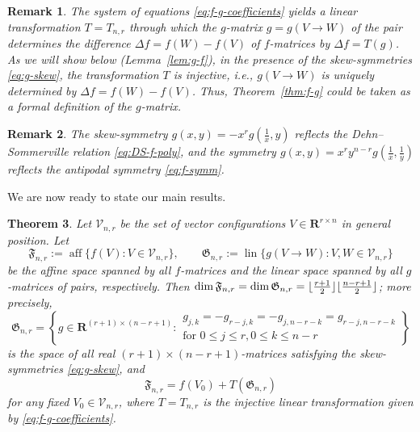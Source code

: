 \documentclass[11pt]{article}
\newtheorem{theorem}{Theorem}
\newtheorem{remark}[theorem]{Remark}
\DeclareMathOperator{\aff}{aff}
\DeclareMathOperator{\lin}{lin}
\newcommand{\fspace}{\mathfrak{F}}
\newcommand{\gspace}{\mathfrak{G}}
\renewcommand{\leq}{\leqslant}
\newcommand{\R}{\mathbf{R}}
\DeclarePairedDelimiter\floor{\lfloor}{\rfloor}
\begin{document}
\begin{remark} 
\label{rem:g-f+DS-g}
The system of equations \eqref{eq:f-g-coefficients} yields a linear transformation $T=T_{n,r}$ through which 
the $g$-matrix $g=g(V\to W)$ of the pair determines the difference $\Delta f=f(W)-f(V)$ of $f$-matrices by $\Delta f=T(g)$. As we will show below (Lemma~\ref{lem:g-f}), in the presence of the skew-symmetries \eqref{eq:g-skew}, the transformation $T$ is injective, i.e., $g(V\to W)$ is uniquely determined by $\Delta f=f(W)-f(V)$. Thus, Theorem~\ref{thm:f-g} could be taken as a formal definition of the $g$-matrix. 
\end{remark}
\begin{remark}
The skew-symmetry $g(x,y)=-x^r g(\frac{1}{x},y)$ reflects the Dehn--Sommerville relation \eqref{eq:DS-f-poly}, and 
the symmetry $g(x,y)=x^ry^{n-r}g(\frac{1}{x},\frac{1}{y})$ reflects the antipodal symmetry \eqref{eq:f-symm}.
\end{remark}
%
We are now ready to state our main results.
%

\begin{theorem}
\label{thm:f-space-g-space} 
Let $\mathcal{V}_{n,r}$ be the set of vector configurations $V\in \R^{r\times n}$ in general position. Let 
\[
\fspace_{n,r}:=\aff\{f(V)\colon V\in \mathcal{V}_{n,r}\}, \qquad \gspace_{n,r}:=\lin\{g(V \to W) \colon V,W \in \mathcal{V}_{n,r}\} 
\]
be the affine space spanned by all $f$-matrices and the linear space spanned by all $g$-matrices of pairs, respectively.
Then $\dim \fspace_{n,r}=\dim \gspace_{n,r}=\floor{\frac{r+1}{2}}\floor{\frac{n-r+1}{2}}$; more precisely, 
\begin{equation}
\label{eq:g-space}
\gspace_{n,r}=\left\{ g \in \R^{(r+1)\times (n-r+1)} \colon \begin{array}{c}g_{j,k}=-g_{r-j,k}=-g_{j,n-r-k}=g_{r-j,n-r-k}\\ \textrm{for } 0\leq j\leq r, 0\leq k\leq n-r\end{array}
\right\}
\end{equation}
is the space of all \emph{real} $(r+1)\times (n-r+1)$-matrices satisfying the skew-symmetries \eqref{eq:g-skew}, and 
\[
\fspace_{n,r}=f(V_0)+T(\gspace_{n,r})
\]
for any fixed $V_0 \in \mathcal{V}_{n,r}$, where $T=T_{n,r}$ is the injective linear transformation given by \eqref{eq:f-g-coefficients}.
\end{theorem}
\end{document}

